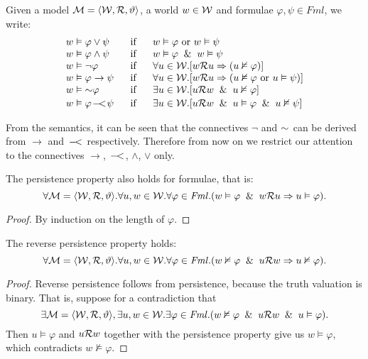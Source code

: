 \documentclass{llncs}
\numberwithin{equation}{section}
\newcommand{\ExAnd}{\wedge}
\newcommand{\ExOr}{\vee}
\newcommand{\ExNot}{\neg}
\newcommand{\ExImp}{\rightarrow}
\newcommand{\Fml}{\mathit{Fml}}
\newcommand{\Force}{\vDash}
\newcommand{\WeakImp}{
\begin{picture}(10,10)
     \put(1,0){$-$}
     \put(7,0){$<$}
   \end{picture}
   \;\; 
}
\newcommand{\WeakNot}{\sim \hspace{-0.1cm}}
\newcommand{\NotForce}{\nvDash}
\newcommand{\MetaImp}{\Rightarrow}
\newcommand{\mycal}[1]{
        {\cal{#1}}
}
\newcommand{\Model}{
        \mycal{M}=\langle \mycal{W}, \mycal{R}, \vartheta \rangle
}
\begin{document}
\begin{definition}\label{forcing}
Given a model $\Model$, a world $w \in \mycal{W}$ and formulae $\varphi, \psi \in \Fml$, we write:
$$
\begin{array}{lll}
	w \Force \varphi \ExOr \psi			&		\ \ \text{if}	\ \ &		w \Force \varphi \text{ or } w \Force \psi \\
	w \Force \varphi \ExAnd \psi		&		\ \ \text{if}	\ \ &		w \Force \varphi \And w \Force \psi \\
	w \Force \ExNot \varphi					&		\ \ \text{if}	\ \ &		\forall u \in \mycal{W} . [w \mycal{R} u \MetaImp (u \NotForce \varphi)] \\
	w \Force \varphi \ExImp \psi		&		\ \ \text{if}	\ \ &		\forall u \in \mycal{W} . [w \mycal{R} u \MetaImp (u \NotForce \varphi \text{ or } u \Force \psi)] \\
	w \Force \; \WeakNot \varphi		&		\ \ \text{if}	\ \ &		\exists u \in \mycal{W} . [u \mycal{R} w \And u \NotForce \varphi] \\
	w \Force \varphi \WeakImp \psi	&		\ \ \text{if}	\ \ &		\exists u \in \mycal{W} . [u \mycal{R} w \And u \Force \varphi \And u \NotForce \psi] \\
\end{array}
$$
\end{definition}

From the semantics, it can be seen that the connectives $\ExNot$ and $\WeakNot \ $ can be derived from $\ExImp$ and $\WeakImp$ respectively. Therefore from now on we restrict our attention to the connectives $\ExImp$, $\WeakImp$, $\ExAnd$, $\ExOr$ only.

\begin{lemma}
The persistence property also holds for formulae, that is:
$$\forall \Model . \forall u,w \in \mycal{W} . \forall \varphi \in \Fml . (w \Force \varphi \And w \mycal{R} u \MetaImp u \Force \varphi).$$
\end{lemma}
\begin{proof}
By induction on the length of $\varphi$. 
\end{proof}

\begin{lemma}
The reverse persistence property holds:
$$\forall \Model . \forall u,w \in \mycal{W} . \forall \varphi \in \Fml . (w \NotForce \varphi \And u \mycal{R} w \MetaImp u \NotForce \varphi).$$
\end{lemma}
\begin{proof}
Reverse persistence follows from persistence, because the truth valuation is binary. That is, suppose for a contradiction that $$\exists \Model, \exists u,w \in \mycal{W} . \exists \varphi \in \Fml . (w \NotForce \varphi \And u \mycal{R} w \And u \Force \varphi).$$
Then $u \Force \varphi$ and $u \mycal{R} w$ together with the persistence property give us $w \Force \varphi$, which contradicts $w \NotForce \varphi$.
\end{proof}
\end{document}
